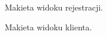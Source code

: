 \begin{figure}[H]
    \centering
    \caption{Makieta widoku rejestracji.}
\end{figure}

\begin{figure}[H]
    \centering
    \caption{Makieta widoku klienta.}
\end{figure}


